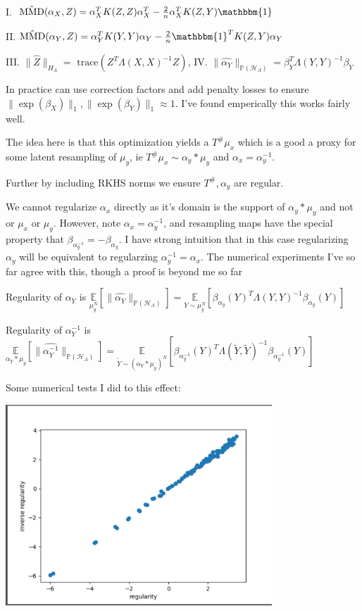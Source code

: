 \documentclass[11pt]{article}
\newcommand{\bs}{{\bigskip}}
\newcommand{\ms}{{\medskip}}
\newcommand{\sms}{{\smallskip}}
\newcommand{\indi}{\mathbbm{1}}
\newcommand{\E}{\mathbb{E}}
\newcommand{\norm}[2]{\| #1 \|_{#2}}
\newcommand{\probp}{\mathbb{P}}
\begin{document}
\sms

I.  $\hat{\text{MMD}}(\alpha_X,  Z)  =  \alpha_X^T K(Z,Z)\alpha_X^T -\frac{2}{n} \alpha_X^TK(Z,Y)\indi$

II.  $\hat{\text{MMD}}(\alpha_Y,  Z)  =   \alpha_Y^T K(Y,Y)\alpha_Y - \frac{2}{n}\indi^TK(Z,Y)\alpha_Y$


III.  $\norm{\hat{Z}}{H_\Lambda} = \text{ trace}(Z^T\Lambda(X,X)^{-1}Z)$,
IV.  ${\norm{\hat{\alpha_Y}}{\probp(\mathcal{H}_{\Lambda})}} =
\beta_Y^T\Lambda(Y,Y)^{-1}\beta_Y $



In practice can use correction factors and add penalty losses to ensure $\norm{\exp(\beta_X)}{1},\norm{\exp(\beta_Y)}{1} \approx 1$.  I've found emperically this works fairly well.


The idea here is that  this optimization  yields a $T^{\#}\mu_x$ which is a good a proxy for some 
latent resampling 
 of $\mu_y$, 
   ie 
$T^{\#}\mu_x \sim \alpha_y \ast \mu_y$ and $\alpha_x = \alpha_y^{-1}$.

Further by including RKHS norms we ensure $T^{\#},  \alpha_y$ are regular.  

We cannot regularize $\alpha_x$ directly as it's domain is  the support of $\alpha_y \ast \mu_y$ and not or $\mu_x$ or $\mu_y$.  However,  note $\alpha_x = \alpha_y^{-1}$,  and resampling maps have the special property that 
$\beta_{\alpha_y^{-1}}= - \beta_{\alpha_y}$.  I have  strong intuition that in this case regularizing $\alpha_y$ will be equivalent to regularzing $ \alpha_y^{-1} = \alpha_x$. The numerical experiments I've so far agree with this,  though a proof is beyond me so far



\pagebreak




Regularity of $\alpha_Y$ is $\underset{\mu_y^N}{\E}[{\norm{\hat{\alpha_Y}}{\probp(\mathcal{H}_{\Lambda})}}] = \underset{Y \sim \mu_y^N}{\E}[\beta_{\alpha_y}(Y)^T\Lambda(Y,Y)^{-1}\beta_{\alpha_y}(Y)]$


\ms


Regularity of $\alpha_Y^{-1}$ is 
$\underset{ \alpha_Y \ast \mu_y}{\E}[{\norm{\hat{\alpha_Y^{-1}}}{\probp(\mathcal{H}_{\Lambda})}}] = \underset{\tilde{Y}  \sim (\alpha_Y \ast \mu_y)^N}{\E}[\beta_{\alpha_y^{-1}}(Y)^T\Lambda(\tilde{Y},\tilde{Y})^{-1}\beta_{\alpha_y^{-1}}(Y)]$

\ms

Some numerical tests I did to this effect:

\bs


 \includegraphics[width=100mm]{reg_comparison.png}




\pagebreak
\end{document}
